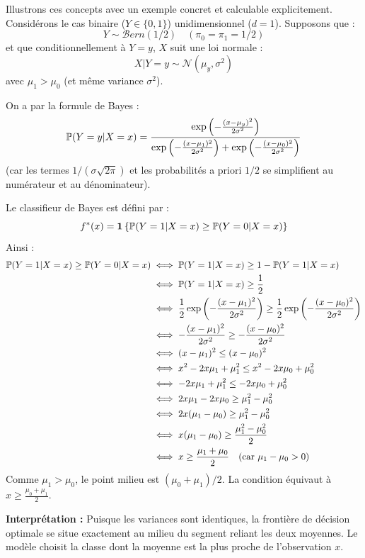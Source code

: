 \begin{exemple}
Illustrons ces concepts avec un exemple concret et calculable explicitement.
Considérons le cas binaire ($Y \in \{0, 1\}$) unidimensionnel ($d=1$).
Supposons que :
\[
Y \sim \mathcal{B}ern(1/2) \quad (\pi_0 = \pi_1 = 1/2)
\]
et que conditionnellement à $Y=y$, $X$ suit une loi normale :
\[
X | Y=y \sim \mathcal{N}(\mu_y, \sigma^2)
\]
avec $\mu_1 > \mu_0$ (et même variance $\sigma^2$).

On a par la formule de Bayes :
\[
\mathbb{P}(Y=y | X=x) = \frac{\exp\left( - \frac{(x-\mu_y)^2}{2\sigma^2} \right)}{\exp\left( - \frac{(x-\mu_1)^2}{2\sigma^2} \right) + \exp\left( - \frac{(x-\mu_0)^2}{2\sigma^2} \right)}
\]
(car les termes $1/(\sigma\sqrt{2\pi})$ et les probabilités a priori $1/2$ se simplifient au numérateur et au dénominateur).

Le classifieur de Bayes est défini par :
\[
f^*(x) = \mathbf{1}\left\{\mathbb{P}(Y=1|X=x) \ge \mathbb{P}(Y=0|X=x)\right\}
\]
Ainsi :
\begin{align*}
\mathbb{P}(Y=1|X=x) \ge \mathbb{P}(Y=0|X=x) &\iff \mathbb{P}(Y=1|X=x) \ge 1 - \mathbb{P}(Y=1|X=x) \\
&\iff \mathbb{P}(Y=1|X=x) \ge \frac{1}{2} \\
&\iff \frac{1}{2}\exp\left( - \frac{(x-\mu_1)^2}{2\sigma^2} \right) \ge \frac{1}{2}\exp\left( - \frac{(x-\mu_0)^2}{2\sigma^2} \right) \\
&\iff - \frac{(x-\mu_1)^2}{2\sigma^2} \ge - \frac{(x-\mu_0)^2}{2\sigma^2} \\
&\iff (x-\mu_1)^2 \le (x-\mu_0)^2 \\
&\iff x^2 - 2x\mu_1 + \mu_1^2 \le x^2 - 2x\mu_0 + \mu_0^2 \\
&\iff - 2x\mu_1 + \mu_1^2 \le - 2x\mu_0 + \mu_0^2 \\
&\iff 2x\mu_1 - 2x\mu_0 \ge \mu_1^2 - \mu_0^2 \\
&\iff 2x(\mu_1 - \mu_0) \ge \mu_1^2 - \mu_0^2 \\
&\iff x(\mu_1 - \mu_0) \ge \frac{\mu_1^2 - \mu_0^2}{2} \\
&\iff x \ge \frac{\mu_1 + \mu_0}{2} \quad (\text{car } \mu_1 - \mu_0 > 0)
\end{align*}
Comme $\mu_1 > \mu_0$, le point milieu est $(\mu_0+\mu_1)/2$. La condition équivaut à $x \ge \frac{\mu_0+\mu_1}{2}$.

\textbf{Interprétation :} Puisque les variances sont identiques, la frontière de décision optimale se situe exactement au milieu du segment reliant les deux moyennes. Le modèle choisit la classe dont la moyenne est la plus proche de l'observation $x$.
\end{exemple}

